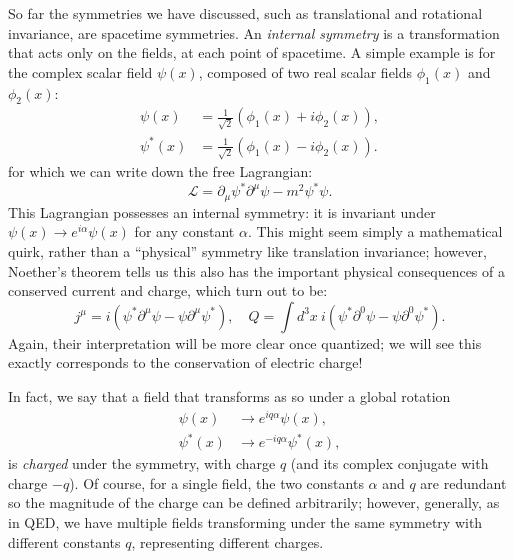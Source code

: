 So far the symmetries we have discussed, such as translational and rotational invariance, are spacetime symmetries.
An \textit{internal symmetry} is a transformation that acts only on the fields, at each point of spacetime.
A simple example is for the complex scalar field $\psi(x)$, composed of two real scalar fields $\phi_1(x)$ and $\phi_2(x)$:  
\begin{equation}
	\label{eq:01_qft_symmetries_complex_scalar}
	\begin{split}
		\psi(x) &= \frac{1}{\sqrt{2}}(\phi_1(x) + i\phi_2(x)), \\
		\psi^*(x) &= \frac{1}{\sqrt{2}}(\phi_1(x) - i\phi_2(x)).
	\end{split}
\end{equation}
for which we can write down the free Lagrangian:
\begin{equation}
	\label{eq:01_qft_symmetries_complex_lagrangian}
	\mathcal{L} = \partial_\mu\psi^*\partial^\mu\psi - m^2\psi^*\psi.
\end{equation}
This Lagrangian possesses an internal \UU[1] symmetry: it is invariant under $\psi(x) \rightarrow e^{i\alpha}\psi(x)$ for any constant $\alpha$.
This might seem simply a mathematical quirk, rather than a ``physical'' symmetry like translation invariance; however, Noether's theorem tells us this also has the important physical consequences of a conserved current and charge, which turn out to be:
\begin{equation}
	\label{eq:01_qft_symmetries_u1_current_charge}
	j^\mu = i(\psi^*\partial^\mu\psi - \psi\partial^\mu\psi^*), \quad Q = \int d^3x\ i(\psi^*\partial^0\psi - \psi\partial^0\psi^*).
\end{equation}
Again, their interpretation will be more clear once quantized; we will see this exactly corresponds to the conservation of electric charge!

In fact, we say that a field that transforms as so under a global \UU[1] rotation
\begin{equation}
	\label{eq:01_qft_symmetries_u1_transformation}
	\begin{split}
		\psi(x) &\rightarrow e^{iq\alpha}\psi(x), \\
		\psi^*(x) &\rightarrow e^{-iq\alpha}\psi^*(x),
	\end{split}
\end{equation}
is \textit{charged} under the \UU[1] symmetry, with charge $q$ (and its complex conjugate with charge $-q$).
Of course, for a single field, the two constants $\alpha$ and $q$ are redundant so the magnitude of the charge can be defined arbitrarily; however, generally, as in QED, we have multiple fields transforming under the same \UU[1] symmetry with different constants $q$, representing different charges. 

